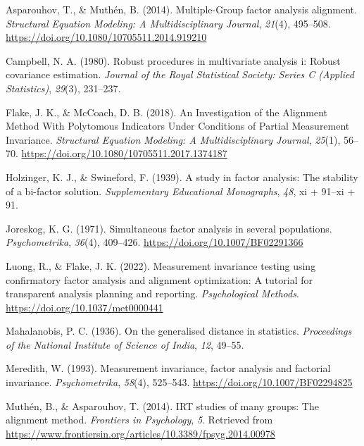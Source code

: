 \documentclass[
  man]{apa7}
\newlength{\cslhangindent}
\newenvironment{CSLReferences}[2] %
 {\begin{list}{}{%
  \setlength{\itemindent}{0pt}
  \setlength{\leftmargin}{0pt}
  \setlength{\parsep}{0pt}
  \ifodd #1
   \setlength{\leftmargin}{\cslhangindent}
   \setlength{\itemindent}{-1\cslhangindent}
  \fi
  \setlength{\itemsep}{#2\baselineskip}}}
 {\end{list}}
\begin{document}
\label{refs}
\begin{CSLReferences}{1}{0}
Asparouhov, T., \& Muthén, B. (2014). Multiple-{Group} factor analysis alignment. \emph{Structural Equation Modeling: A Multidisciplinary Journal}, \emph{21}(4), 495--508. \url{https://doi.org/10.1080/10705511.2014.919210}

Campbell, N. A. (1980). Robust procedures in multivariate analysis i: Robust covariance estimation. \emph{Journal of the Royal Statistical Society: Series C (Applied Statistics)}, \emph{29}(3), 231--237.

Flake, J. K., \& McCoach, D. B. (2018). An {Investigation} of the {Alignment} {Method} {With} {Polytomous} {Indicators} {Under} {Conditions} of {Partial} {Measurement} {Invariance}. \emph{Structural Equation Modeling: A Multidisciplinary Journal}, \emph{25}(1), 56--70. \url{https://doi.org/10.1080/10705511.2017.1374187}

Holzinger, K. J., \& Swineford, F. (1939). A study in factor analysis: The stability of a bi-factor solution. \emph{Supplementary Educational Monographs}, \emph{48}, xi + 91--xi + 91.

Joreskog, K. G. (1971). Simultaneous factor analysis in several populations. \emph{Psychometrika}, \emph{36}(4), 409--426. \url{https://doi.org/10.1007/BF02291366}

Luong, R., \& Flake, J. K. (2022). Measurement invariance testing using confirmatory factor analysis and alignment optimization: {A} tutorial for transparent analysis planning and reporting. \emph{Psychological Methods}. \url{https://doi.org/10.1037/met0000441}

Mahalanobis, P. C. (1936). On the generalised distance in statistics. \emph{Proceedings of the National Institute of Science of India}, \emph{12}, 49--55.

Meredith, W. (1993). Measurement invariance, factor analysis and factorial invariance. \emph{Psychometrika}, \emph{58}(4), 525--543. \url{https://doi.org/10.1007/BF02294825}

Muthén, B., \& Asparouhov, T. (2014). {IRT} studies of many groups: The alignment method. \emph{Frontiers in Psychology}, \emph{5}. Retrieved from \url{https://www.frontiersin.org/articles/10.3389/fpsyg.2014.00978}


\end{CSLReferences}
\end{document}
